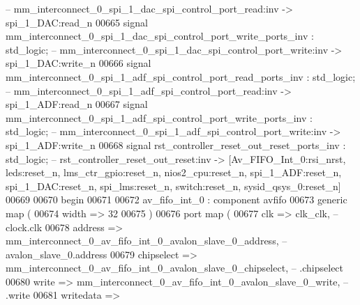 \begin{DoxyCode}
{                   -- mm\_interconnect\_0\_spi\_1\_dac\_spi\_control\_port\_read:inv -> spi\_1\_DAC:read\_n}
00665     \textcolor{keywordflow}{signal} \textcolor{vhdlchar}{mm_interconnect_0_spi_1_dac_spi_control_port_write_ports_inv}                \textcolor{vhdlchar}{:} \textcolor{comment}{std\_logic};\textcolor{keyword}{        
                   -- mm\_interconnect\_0\_spi\_1\_dac\_spi\_control\_port\_write:inv -> spi\_1\_DAC:write\_n}
00666     \textcolor{keywordflow}{signal} \textcolor{vhdlchar}{mm_interconnect_0_spi_1_adf_spi_control_port_read_ports_inv}                 \textcolor{vhdlchar}{:} \textcolor{comment}{std\_logic};\textcolor{keyword}{        
                   -- mm\_interconnect\_0\_spi\_1\_adf\_spi\_control\_port\_read:inv -> spi\_1\_ADF:read\_n}
00667     \textcolor{keywordflow}{signal} \textcolor{vhdlchar}{mm_interconnect_0_spi_1_adf_spi_control_port_write_ports_inv}                \textcolor{vhdlchar}{:} \textcolor{comment}{std\_logic};\textcolor{keyword}{        
                   -- mm\_interconnect\_0\_spi\_1\_adf\_spi\_control\_port\_write:inv -> spi\_1\_ADF:write\_n}
00668     \textcolor{keywordflow}{signal} \textcolor{vhdlchar}{rst_controller_reset_out_reset_ports_inv}                                    \textcolor{vhdlchar}{:} \textcolor{comment}{std\_logic};\textcolor{keyword}{        
                   -- rst\_controller\_reset\_out\_reset:inv -> [Av\_FIFO\_Int\_0:rsi\_nrst, leds:reset\_n,
       lms\_ctr\_gpio:reset\_n, nios2\_cpu:reset\_n, spi\_1\_ADF:reset\_n, spi\_1\_DAC:reset\_n, spi\_lms:reset\_n, switch:reset\_n,
       sysid\_qsys\_0:reset\_n]}
00669 
00670 \textcolor{vhdlkeyword}{begin}
00671 
00672     av_fifo_int_0 : \textcolor{keywordflow}{component} avfifo
00673         \textcolor{keywordflow}{generic} \textcolor{keywordflow}{map} (
00674             width => \textcolor{vhdllogic}{32}
00675         \textcolor{vhdlchar}{)}
00676         \textcolor{keywordflow}{port} \textcolor{keywordflow}{map} (
00677             clk            => clk_clk,\textcolor{keyword}{                                                   --         
       clock.clk}
00678             address        => 
      mm_interconnect_0_av_fifo_int_0_avalon_slave_0_address,\textcolor{keyword}{    -- avalon\_slave\_0.address}
00679             chipselect     => 
      mm_interconnect_0_av_fifo_int_0_avalon_slave_0_chipselect,\textcolor{keyword}{ --               .chipselect}
00680             write          => 
      mm_interconnect_0_av_fifo_int_0_avalon_slave_0_write,\textcolor{keyword}{      --               .write}
00681             writedata      => 

\end{DoxyCode}
